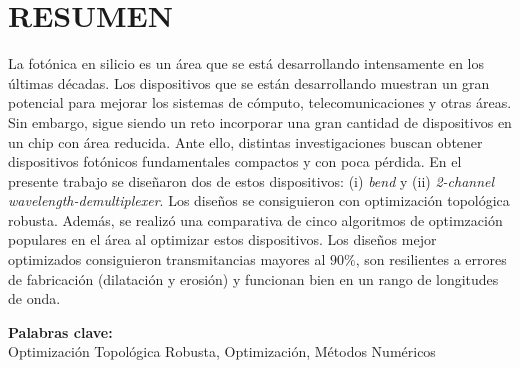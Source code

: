 \chapter*{\center \Large \vspace{-4.5cm} RESUMEN}

La fotónica en silicio es un área que se está desarrollando intensamente en los últimas décadas.
Los dispositivos que se están desarrollando muestran un gran potencial para mejorar
los sistemas de cómputo, telecomunicaciones y otras áreas.
Sin embargo, sigue siendo un reto incorporar una gran cantidad de dispositivos en un chip con área
reducida.
Ante ello, distintas investigaciones buscan obtener dispositivos fotónicos fundamentales compactos
y con poca pérdida. En el presente trabajo se diseñaron dos de estos dispositivos:
(i) \emph{bend} y (ii) \emph{2-channel wavelength-demultiplexer}.
Los diseños se consiguieron con optimización 
topológica robusta.
Además, se realizó una comparativa de cinco algoritmos de optimzación populares en el área al optimizar
estos dispositivos.
Los diseños mejor optimizados consiguieron transmitancias mayores al $90 \%$, son resilientes a errores
de fabricación (dilatación y erosión) y funcionan bien en un rango de longitudes de onda.

\noindent \textbf{Palabras clave:}\\
\noindent Optimización Topológica Robusta, Optimización, Métodos Numéricos
